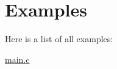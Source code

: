 \section{Examples}
Here is a list of all examples\-:\begin{DoxyCompactItemize}
\item 
\hyperlink{main_8c-example}{main.\-c}
\end{DoxyCompactItemize}
